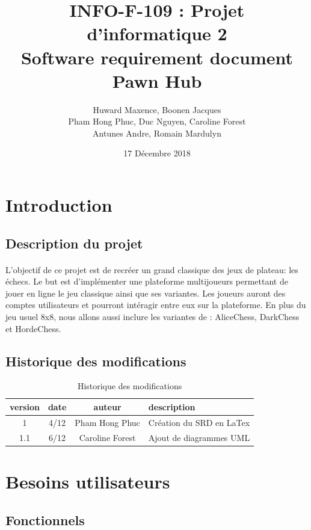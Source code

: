 \documentclass[10pt, a4paper]{article}
\title{INFO-F-109 : Projet d'informatique 2 \\
       \textbf{Software requirement document\\
	   Pawn Hub}}
\author{Huward Maxence, Boonen Jacques\\
		Pham Hong Phuc, Duc Nguyen, Caroline Forest\\
		Antunes Andre, Romain Mardulyn}
\date{17 Décembre 2018}
\begin{document}
	\maketitle
	\tableofcontents %
	\newpage
	\section{Introduction}
		\subsection{Description du projet}
			\paragraph{}L'objectif de ce projet est de recréer un grand classique des jeux de plateau: les échecs. Le but est d'implémenter une plateforme multijoueurs permettant de jouer en ligne le jeu classique ainsi que ses variantes.
Les joueurs auront des comptes utilisateurs et pourront intéragir entre eux sur la plateforme.
En plus du jeu usuel 8x8, nous allons aussi inclure les variantes de : AliceChess, DarkChess et HordeChess.

		\subsection{Historique des modifications}
		
		\begin{table}[h!]
			\centering
			\begin{tabular}{|c|c|c|p{50mm}|}
				\hline
				 \textbf{version} & \textbf{date} & \textbf{auteur}  & \textbf{description} \\ \hline
				 1 & 4/12 & Pham Hong Phuc & Création du SRD en LaTex\\ \hline
				 1.1 & 6/12 & Caroline Forest & Ajout de diagrammes UML\\ \hline

\end{tabular}
			\caption*{Historique des modifications}
			\end{table}


	\section{Besoins utilisateurs}
		\subsection{Fonctionnels}
		
\end{document}
